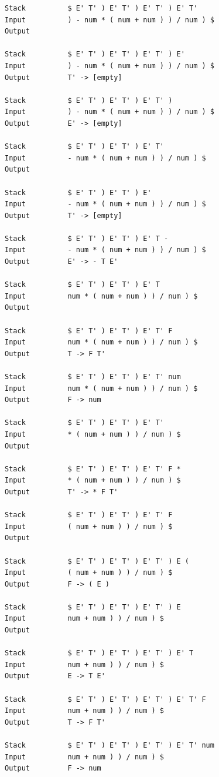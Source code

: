 \documentclass[lang=cn,11pt,a4paper,cite=authornum]{paper}
\begin{document}
\begin{code}
\begin{verbatim}
Stack          $ E' T' ) E' T' ) E' T' ) E' T' 
Input          ) - num * ( num + num ) ) / num ) $ 
Output         

Stack          $ E' T' ) E' T' ) E' T' ) E' 
Input          ) - num * ( num + num ) ) / num ) $ 
Output         T' -> [empty] 

Stack          $ E' T' ) E' T' ) E' T' ) 
Input          ) - num * ( num + num ) ) / num ) $ 
Output         E' -> [empty] 

Stack          $ E' T' ) E' T' ) E' T' 
Input          - num * ( num + num ) ) / num ) $ 
Output         

Stack          $ E' T' ) E' T' ) E' 
Input          - num * ( num + num ) ) / num ) $ 
Output         T' -> [empty] 

Stack          $ E' T' ) E' T' ) E' T - 
Input          - num * ( num + num ) ) / num ) $ 
Output         E' -> - T E' 

Stack          $ E' T' ) E' T' ) E' T 
Input          num * ( num + num ) ) / num ) $ 
Output         

Stack          $ E' T' ) E' T' ) E' T' F 
Input          num * ( num + num ) ) / num ) $ 
Output         T -> F T' 

Stack          $ E' T' ) E' T' ) E' T' num 
Input          num * ( num + num ) ) / num ) $ 
Output         F -> num 

Stack          $ E' T' ) E' T' ) E' T' 
Input          * ( num + num ) ) / num ) $ 
Output         

Stack          $ E' T' ) E' T' ) E' T' F * 
Input          * ( num + num ) ) / num ) $ 
Output         T' -> * F T' 

Stack          $ E' T' ) E' T' ) E' T' F 
Input          ( num + num ) ) / num ) $ 
Output         

Stack          $ E' T' ) E' T' ) E' T' ) E ( 
Input          ( num + num ) ) / num ) $ 
Output         F -> ( E ) 

Stack          $ E' T' ) E' T' ) E' T' ) E 
Input          num + num ) ) / num ) $ 
Output         

Stack          $ E' T' ) E' T' ) E' T' ) E' T 
Input          num + num ) ) / num ) $ 
Output         E -> T E' 

Stack          $ E' T' ) E' T' ) E' T' ) E' T' F 
Input          num + num ) ) / num ) $ 
Output         T -> F T' 

Stack          $ E' T' ) E' T' ) E' T' ) E' T' num 
Input          num + num ) ) / num ) $ 
Output         F -> num 


\end{verbatim}
\end{code}
\end{document}
